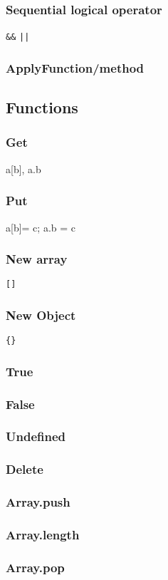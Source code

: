 \subsubsection{Sequential logical operator}
\verb|&&| \verb#||#
\subsubsection{ApplyFunction/method}

\subsection{Functions}
\subsubsection{Get}
a[b], a.b
\subsubsection{Put}
a[b]= c; a.b = c
\subsubsection{New array}
\verb|[]|
\subsubsection{New Object}
\verb|{}|
\subsubsection{True}
\subsubsection{False}
\subsubsection{Undefined}
\subsubsection{Delete}
\subsubsection{Array.push}
\subsubsection{Array.length}
\subsubsection{Array.pop}
